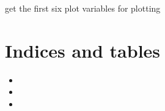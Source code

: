 \documentclass[letterpaper,10pt,english]{sphinxmanual}
\begin{document}
\begin{fulllineitems}
\begin{quote}
\begin{description}
\begin{itemize}
\end{itemize}

\end{description}\end{quote}

\begin{fulllineitems}
\label{Procedure:ProcedureObject.Procedure.get_plot_vars}
get the first six plot variables for plotting

\end{fulllineitems}


\end{fulllineitems}



\chapter{Indices and tables}
\label{index:indices-and-tables}\begin{itemize}
\item {} 

\item {} 

\item {} 

\end{itemize}



\renewcommand{\indexname}{Index}
\printindex
\end{document}
